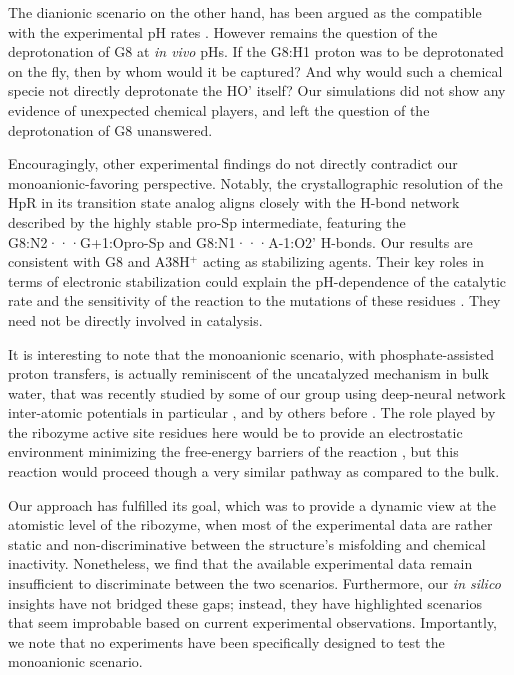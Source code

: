 \documentclass[journal=jacsat,manuscript=article]{achemso}
\begin{document}
The dianionic scenario on the other hand, has been argued 
as the compatible with the experimental pH rates \cite{kath-schorr_general_2012,wilson_hairpin_2011}. 
However remains the question of the deprotonation of G8 at \textit{in vivo} pHs. 
If the G8:H1 proton was to be deprotonated on the fly, then by whom would it be captured? 
And why would such a chemical specie not directly deprotonate the HO' itself? 
Our simulations did not show any evidence of unexpected chemical players, 
and left the question of the deprotonation of G8 unanswered.

Encouragingly, other experimental findings do not directly contradict our monoanionic-favoring perspective.
Notably, the crystallographic resolution of the HpR in its transition state analog \cite{torelli_comparison_2007}
aligns closely with the H-bond network described by the highly stable pro-Sp intermediate,
featuring the G8:N2···G+1:Opro-Sp and G8:N1···A-1:O2' H-bonds.
Our results are consistent with G8 and A38H$^+$ acting as stabilizing agents.
Their key roles in terms of electronic stabilization 
could explain the pH-dependence of the catalytic rate \cite{lebruska_rescue_2002, bevilacqua_mechanistic_2003, kuzmin_role_2004, nahas_observation_2004, wilson_nucleobase_2006, wilson_hairpin_2011} 
and the sensitivity of the reaction to the mutations of these residues \cite{mlynsky_extensive_2010, mlynsky_reactive_2015}. 
They need not be directly involved in catalysis.

It is interesting to note that the monoanionic scenario, 
with phosphate-assisted proton transfers, 
is actually reminiscent of the uncatalyzed mechanism in bulk water, 
that was recently studied by some of our group using deep-neural network inter-atomic potentials in particular \cite{benayad_molecular_2022,benayad_molecular_2023}, 
and by others before \cite{florian_phosphate_1998,duarte_resolving_2015}. 
The role played by the ribozyme active site residues here would be to 
provide an electrostatic environment minimizing the free-energy barriers of the reaction \cite{warshel_electrostatic_2006}, 
but this reaction would proceed though a very similar pathway as compared to the bulk.

Our approach has fulfilled its goal, which was to provide a dynamic view at the atomistic level of the ribozyme,
when most of the experimental data are rather static and non-discriminative 
between the structure's misfolding and chemical inactivity.
Nonetheless, we find that the available experimental data remain insufficient to discriminate between the two scenarios.
Furthermore, our \textit{in silico} insights have not bridged these gaps;
instead, they have highlighted scenarios that seem improbable based on current experimental observations.
Importantly, we note that no experiments have been specifically designed to test the monoanionic scenario.
\end{document}
